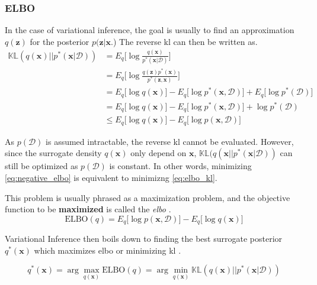 \subsubsection{ELBO}
In the case of variational inference, the goal is usually to find an approximation $q(\mathbf{z})$ for the posterior $p(\mathbf{z} | \mathbf{x}$.) The reverse \acrshort{kl} can then be written as.
\begin{subequations}
\begin{align}
    \mathbb{KL}(q(\mathbf{x}) || p^*(\mathbf{x} | \mathcal{D})) &= E_q\big[\log \frac{q(\mathbf{x})}{p^*(\mathbf{x} | \mathcal{D})} \big]\label{eq:elbo_kl}\\
    &= E_q\big[\log \frac{q(\mathbf{z}) p^*(\mathbf{x})}{p^*(\mathbf{z}, \mathbf{x})} \big]\\
    &= E_q\big[\log q(\mathbf{x}) \big] - E_q\big[\log p^*(\mathbf{x}, \mathcal{D})] + E_q\big[\log p^*(\mathcal{D}) \big]\\
    &= E_q\big[\log q(\mathbf{x}) \big] - E_q\big[\log p^*(\mathbf{x}, \mathcal{D})] + \log p^*(\mathcal{D})\\
    &\leq E_q\big[\log q(\mathbf{x}) \big] - E_q\big[\log p(\mathbf{x}, \mathcal{D})]\label{eq:negative_elbo}
\end{align}
\end{subequations}

As $p(\mathcal{D})$ is assumed intractable, the reverse \acrshort{kl} cannot be evaluated. However, since the surrogate density $q(\mathbf{x})$ only depend on $\mathbf{x}$, $\mathbb{KL}(q(\mathbf{x} || p^*(\mathbf{x} | \mathcal{D}))$ can still be optimized as $p(\mathcal{D})$ is constant. In other words, minimizing \cref{eq:negative_elbo} is equivalent to minimizng \cref{eq:elbo_kl}.

This problem is usually phrased as a maximization problem, and the objective function to be \textbf{maximized} is called the \textit{\acrfull{elbo}} \cite{Blei_2017}.
\begin{equation}
    \text{ELBO}(q) = E_q\big[\log p(\mathbf{x}, \mathcal{D})] - E_q\big[\log q(\mathbf{x}) \big]
\end{equation}

Variational Inference then boils down to finding the best surrogate posterior $q^*(\mathbf{x})$ which maximizes \acrshort{elbo} or minimizing \acrshort{kl} \cite{Blei_2017}.

\begin{equation}
    q^*(\mathbf{x}) = \arg \max_{q(\mathbf{x})} \text{ELBO}(q) = \arg \min_{q(\mathbf{x})} \mathbb{KL}(q(\mathbf{x}) || p^*(\mathbf{x} | \mathcal{D}))
\end{equation}



